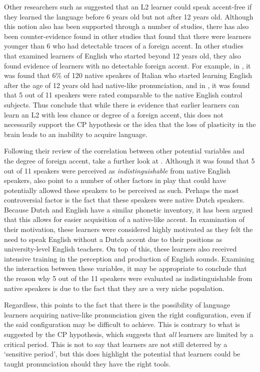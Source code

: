 \documentclass
[
    a4paper,
    twoside,
    12pt,
]
{report}
\begin{document}
Other researchers such as \textcite{long1990} suggested that an L2
learner could speak accent-free if they learned the language before 6
years old but not after 12 years old. Although this notion also has been
supported through a number of studies, there has also been
counter-evidence found in other studies that found that there were
learners younger than 6 who had detectable traces of a foreign accent.
In other studies that examined learners of English who started beyond 12
years old, they also found evidence of learners with no detectable
foreign accent. For example, in \textcite{flege1995}, it was found that
6\% of 120 native speakers of Italian who started learning English after
the age of 12 years old had native-like pronunciation, and in
\textcite{bongaerts1995}, it was found that 5 out of 11 speakers were
rated comparable to the native English control subjects. Thus
\textcite{piske2001} conclude that while there is evidence that earlier
learners can learn an L2 with less chance or degree of a foreign accent,
this does not necessarily support the CP hypothesis or the idea that the
loss of plasticity in the brain leads to an inability to acquire
language.

Following their review of the correlation between other potential
variables and the degree of foreign accent, \textcite{piske2001} take a
further look at \textcite{bongaerts1995}. Although it was found that 5
out of 11 speakers were perceived as \textit{indistinguishable} from
native English speakers, \textcite{piske2001} also point to a number of
other factors in play that could have potentially allowed these speakers
to be perceived as such. Perhaps the most controversial factor is the
fact that these speakers were native Dutch speakers. Because Dutch and
English have a similar phonetic inventory, it has been argued that this
allows for easier acquisition of a native-like accent. In examination of
their motivation, these learners were considered highly motivated as
they felt the need to speak English without a Dutch accent due to their
positions as university-level English teachers. On top of this, these
learners also received intensive training in the perception and
production of English sounds. Examining the interaction between these
variables, it may be appropriate to conclude that the reason why 5 out
of the 11 speakers were evaluated as indistinguishable from native
speakers is due to the fact that they are a very niche population.

Regardless, this points to the fact that there is the possibility of
language learners acquiring native-like pronunciation given the right
configuration, even if the said configuration may be difficult to
achieve. This is contrary to what is suggested by the CP hypothesis,
which suggests that \emph{all} learners are limited by a critical
period. This is not to say that learners are not still deterred by a
`sensitive period', but this does highlight the potential that learners
could be taught pronunciation should they have the right tools.
\end{document}
